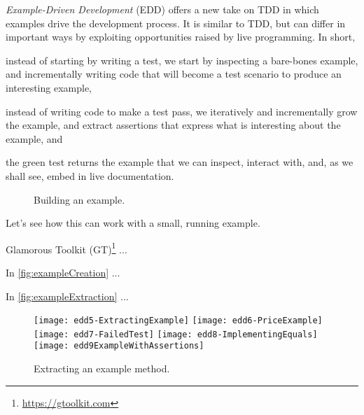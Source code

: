 \documentclass[sigplan,anonymous,review,10pt]{acmart}
\begin{document}
\emph{Example-Driven Development} (EDD) offers a new take on TDD in which examples drive the development process.
It is similar to TDD, but can differ in important ways by exploiting opportunities raised by live programming.
In short,
\begin{inparaenum}[(i)]
	\item instead of starting by writing a test, we start by inspecting a bare-bones example, and incrementally writing code that will become a test scenario to produce an interesting example,
	\item instead of writing code to make a test pass, we iteratively and incrementally grow the example, and extract assertions that express what is interesting about the example,
and
	\item the green test returns the example that we can inspect, interact with, and, as we shall see, embed in live documentation.
\end{inparaenum}


\begin{figure}[ht]
\begin{subfigure}
  \texttt{[image: edd1-ConcretePrice100Euros]}
\end{subfigure}
\begin{subfigure}
  \texttt{[image: edd2-PrototypingAsPrice]}
\end{subfigure}
\begin{subfigure}
  \texttt{[image: edd3-ExtractAsPrice]}
\end{subfigure}
\begin{subfigure}
  \texttt{[image: edd4-MoneyAsPrice]}
\end{subfigure}
   \caption{Building an example.}
  \label{fig:exampleCreation}
\end{figure}

Let's see how this can work with a small, running example.


Glamorous Toolkit (GT)\footnote{\url{https://gtoolkit.com}} ...

In \autoref{fig:exampleCreation} ...


In \autoref{fig:exampleExtraction} ...



\begin{figure}[ht]
  \texttt{[image: edd5-ExtractingExample]}
  \texttt{[image: edd6-PriceExample]}
  \texttt{[image: edd7-FailedTest]}
  \texttt{[image: edd8-ImplementingEquals]}
  \texttt{[image: edd9ExampleWithAssertions]}
  \caption{Extracting an example method.}
  \label{fig:exampleExtraction}
\end{figure}
\end{document}
